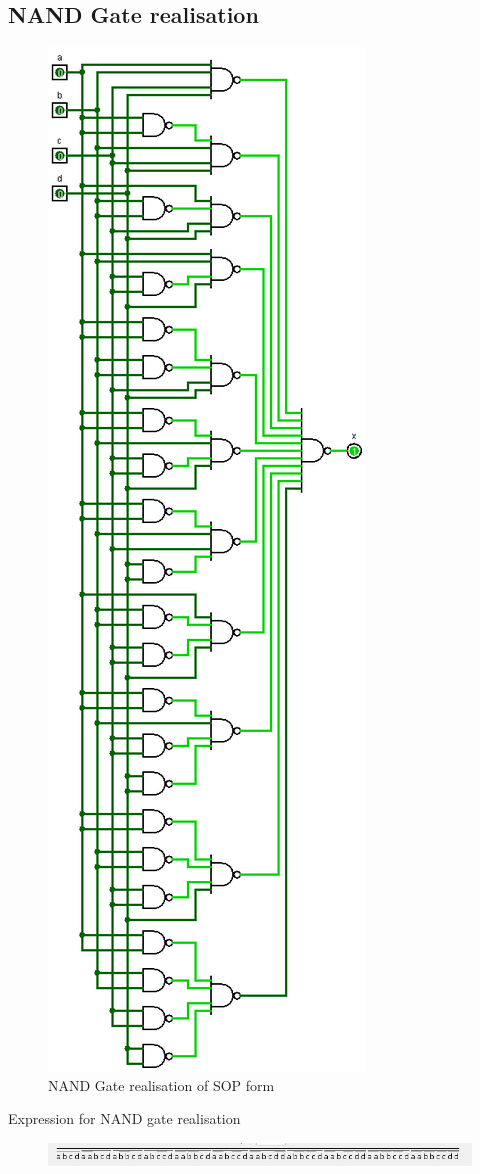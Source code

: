 \documentclass[12pt]{article}
\begin{document}
\subsection*{NAND Gate realisation}
\begin{center}
    \begin{figure}[ht]
        \includegraphics[scale=0.25]{SOP_NAND.png}
        \caption{NAND Gate realisation of SOP form}
    \end{figure}
\end{center}
\begin{center}
    Expression for NAND gate realisation
    \begin{figure}[ht]
        \includegraphics{SOP_NAND_exp.jpg}
    \end{figure}
\end{center}
\newpage
\end{document}
